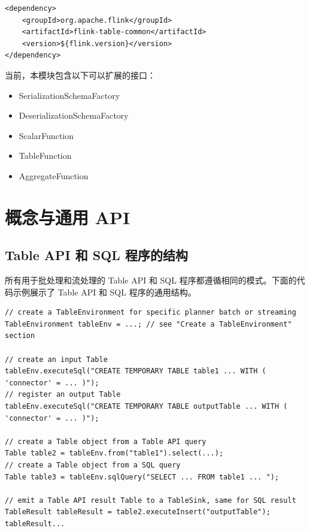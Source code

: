\documentclass[cn,11pt,chinese]{elegantbook}
\begin{document}
\begin{verbatim}
<dependency>
    <groupId>org.apache.flink</groupId>
    <artifactId>flink-table-common</artifactId>
    <version>${flink.version}</version>
</dependency>
\end{verbatim}

当前，本模块包含以下可以扩展的接口：

\begin{itemize}
    \item SerializationSchemaFactory
    \item DeserializationSchemaFactory
    \item ScalarFunction
    \item TableFunction
    \item AggregateFunction
\end{itemize}

\section{概念与通用 API}

\subsection{Table API 和 SQL 程序的结构}

所有用于批处理和流处理的 Table API 和 SQL 程序都遵循相同的模式。下面的代码示例展示了 Table API 和 SQL 程序的通用结构。

\begin{verbatim}
// create a TableEnvironment for specific planner batch or streaming
TableEnvironment tableEnv = ...; // see "Create a TableEnvironment" section

// create an input Table
tableEnv.executeSql("CREATE TEMPORARY TABLE table1 ... WITH ( 'connector' = ... )");
// register an output Table
tableEnv.executeSql("CREATE TEMPORARY TABLE outputTable ... WITH ( 'connector' = ... )");

// create a Table object from a Table API query
Table table2 = tableEnv.from("table1").select(...);
// create a Table object from a SQL query
Table table3 = tableEnv.sqlQuery("SELECT ... FROM table1 ... ");

// emit a Table API result Table to a TableSink, same for SQL result
TableResult tableResult = table2.executeInsert("outputTable");
tableResult...
\end{verbatim}
\end{document}
